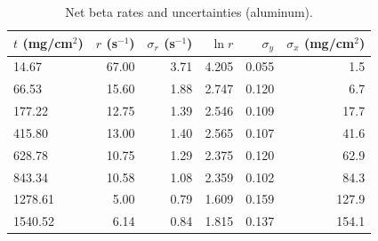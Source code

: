\begin{table}[htbp]
\centering
\caption{Net beta rates and uncertainties (aluminum).}
\label{tab:beta-net}
\begin{tabular}{lrrrrr}
\toprule
$t$ (mg/cm$^2$) & $r$ (s$^{-1}$) & $\sigma_r$ (s$^{-1}$) & $\ln r$ & $\sigma_y$ & $\sigma_x$ (mg/cm$^2$) \\
\midrule
14.67 & 67.00 & 3.71 & 4.205 & 0.055 & 1.5 \\
66.53 & 15.60 & 1.88 & 2.747 & 0.120 & 6.7 \\
177.22 & 12.75 & 1.39 & 2.546 & 0.109 & 17.7 \\
415.80 & 13.00 & 1.40 & 2.565 & 0.107 & 41.6 \\
628.78 & 10.75 & 1.29 & 2.375 & 0.120 & 62.9 \\
843.34 & 10.58 & 1.08 & 2.359 & 0.102 & 84.3 \\
1278.61 & 5.00 & 0.79 & 1.609 & 0.159 & 127.9 \\
1540.52 & 6.14 & 0.84 & 1.815 & 0.137 & 154.1 \\
\bottomrule
\end{tabular}
\end{table}
